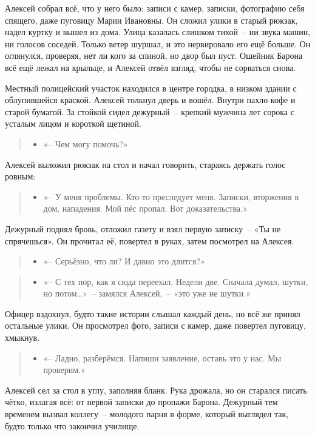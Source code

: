 \documentclass[12pt,a4paper]{book}
\newenvironment{dialogue}{\begin{quote}\itshape\begin{itemize}\item[]}{\end{itemize}\end{quote}}
\begin{document}
Алексей собрал всё, что у него было: записи с камер, записки, фотографию себя спящего, даже пуговицу Марии Ивановны. Он сложил улики в старый рюкзак, надел куртку и вышел из дома. Улица казалась слишком тихой~-- ни звука машин, ни голосов соседей. Только ветер шуршал, и это нервировало его ещё больше. Он оглянулся, проверяя, нет ли кого за спиной, но двор был пуст. Ошейник Барона всё ещё лежал на крыльце, и Алексей отвёл взгляд, чтобы не сорваться снова.

Местный полицейский участок находился в центре городка, в низком здании с облупившейся краской. Алексей толкнул дверь и вошёл. Внутри пахло кофе и старой бумагой. За стойкой сидел дежурный~-- крепкий мужчина лет сорока с усталым лицом и короткой щетиной.

\begin{dialogue}
«-- Чем могу помочь?»
\end{dialogue}

Алексей выложил рюкзак на стол и начал говорить, стараясь держать голос ровным:

\begin{dialogue}
«-- У меня проблемы. Кто-то преследует меня. Записки, вторжения в дом, нападения. Мой пёс пропал. Вот доказательства.»
\end{dialogue}

Дежурный поднял бровь, отложил газету и взял первую записку~-- «Ты не спрячешься». Он прочитал её, повертел в руках, затем посмотрел на Алексея.

\begin{dialogue}
«-- Серьёзно, что ли? И давно это длится?»
\end{dialogue}

\begin{dialogue}
«-- С тех пор, как я сюда переехал. Недели две. Сначала думал, шутки, но потом\ldots»~-- замялся Алексей,~-- «это уже не шутки.»
\end{dialogue}

Офицер вздохнул, будто такие истории слышал каждый день, но всё же принял остальные улики. Он просмотрел фото, записи с камер, даже повертел пуговицу, хмыкнув.

\begin{dialogue}
«-- Ладно, разберёмся. Напиши заявление, оставь это у нас. Мы проверим.»
\end{dialogue}

Алексей сел за стол в углу, заполняя бланк. Рука дрожала, но он старался писать чётко, излагая всё: от первой записки до пропажи Барона. Дежурный тем временем вызвал коллегу~-- молодого парня в форме, который выглядел так, будто только что закончил училище.
\end{document}
